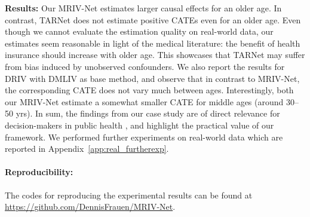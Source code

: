 \documentclass{article} %
\newcommand{\modelname}{\mbox{MRIV-Net}\xspace}
\theoremstyle{definition}
\theoremstyle{plain}
\begin{document}
\textbf{Results:} Our \modelname estimates larger causal effects for an older age. In contrast, TARNet does not estimate positive CATEs even for an older age. 
Even though we cannot evaluate the estimation quality on real-world data, our estimates seem reasonable in light of the medical literature: the benefit of health insurance should increase with older age. This showcases that TARNet may suffer from bias induced by unobserved confounders. We also report the results for DRIV with DMLIV as base method, and observe that in contrast to \modelname, the corresponding CATE does not vary much between ages. Interestingly, both our \modelname estimate a somewhat smaller CATE for middle ages (around 30--50 yrs).
In sum, the findings from our case study are of direct relevance for decision-makers in public health \citep{Imbens.1994}, and highlight the practical value of our framework. We performed further experiments on real-world data which are reported in Appendix~\ref{app:real_furtherexp}.



\clearpage

\paragraph{Reproducibility:} The codes for reproducing the experimental results can be found at \url{https://github.com/DennisFrauen/MRIV-Net}.
\end{document}
